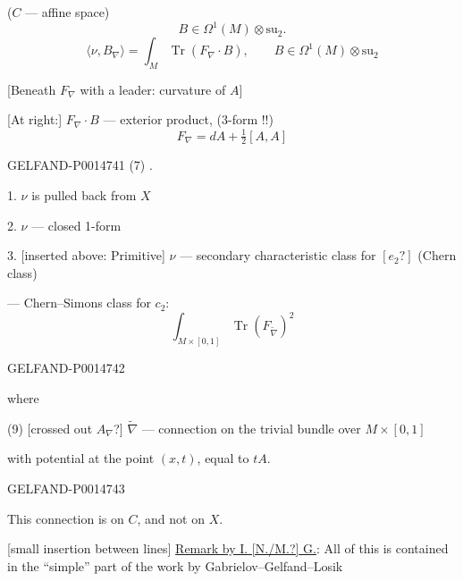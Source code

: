 (\(C\) — affine space)
\[
B\in\Omega^1(M)\otimes\mathrm{su}_2.
\]
\begin{equation*}
\langle\nu,B_\nabla\rangle
 =\int_M\operatorname{Tr}(F_\nabla\cdot B),\qquad
 B\in\Omega^1(M)\otimes\mathrm{su}_2
\tag{5}
\end{equation*}

[Beneath \(F_\nabla\) with a leader: curvature of \(A\)]

[At right:] \(F_\nabla\cdot B\) — exterior product, (3-form !!)
\begin{equation*}
F_\nabla=dA+\tfrac12[A,A]
\tag{6}
\end{equation*}


\begin{GelfandAdjacentEvidence}{GELFAND-P001474}{1}
(7) .

1. \(\nu\) is pulled back from \(X\)

2. \(\nu\) — closed 1-form

3. [inserted above: Primitive] \(\nu\) — secondary characteristic class for \([e_2?]\) (Chern class)

— Chern–Simons class for \(c_2\):
\begin{equation*}
\int_{M\times[0,1]}\operatorname{Tr}(F_{\widetilde{\nabla}})^2
\tag{8}
\end{equation*}
\end{GelfandAdjacentEvidence}
\begin{GelfandAdjacentEvidence}{GELFAND-P001474}{2}


where

(9) [crossed out \(A_\nabla\)?] \(\widetilde{\nabla}\) — connection on the trivial bundle over \(M\times[0,1]\)

with potential at the point \((x,t)\), equal to \(tA\).

\end{GelfandAdjacentEvidence}
\begin{GelfandAdjacentEvidence}{GELFAND-P001474}{3}


This connection is on \(C\), and not on \(X\).

[small insertion between lines] \underline{Remark by I. [N./M.?] G.}: All of this is contained in the “simple” part of the work by Gabrielov–Gelfand–Losik
\end{GelfandAdjacentEvidence}
